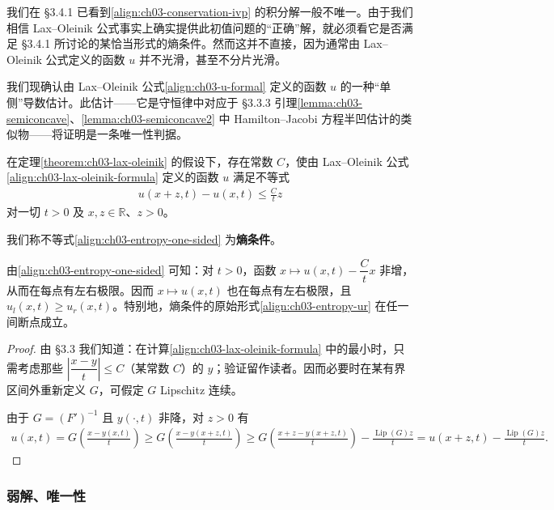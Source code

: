\documentclass[../../main.tex]{subfiles}
\begin{document}
我们在 \S3.4.1 已看到\eqref{align:ch03-conservation-ivp} 的积分解一般不唯一。由于我们相信 Lax--Oleinik 公式事实上确实提供此初值问题的``正确''解，就必须看它是否满足 \S3.4.1 所讨论的某恰当形式的熵条件。然而这并不直接，因为通常由 Lax--Oleinik 公式定义的函数 $u$ 并不光滑，甚至不分片光滑。

我们现确认由 Lax--Oleinik 公式\eqref{align:ch03-u-formal} 定义的函数 $u$ 的一种``单侧''导数估计。此估计——它是守恒律中对应于 \S3.3.3 引理\cref{lemma:ch03-semiconcave}、\cref{lemma:ch03-semiconcave2} 中 Hamilton--Jacobi 方程半凹估计的类似物——将证明是一条唯一性判据。

\begin{lemma}[单侧跃变估计]\label{lemma:ch03-one-sided-jump}在定理\cref{theorem:ch03-lax-oleinik} 的假设下，存在常数 $C$，使由 Lax--Oleinik 公式\eqref{align:ch03-lax-oleinik-formula} 定义的函数 $u$ 满足不等式
\begin{align}\label{align:ch03-entropy-one-sided}
u(x+z,t)-u(x,t)\leqslant\frac{C}{t}z
\end{align}
对一切 $t>0$ 及 $x,z\in\mathbb{R}$、$z>0$。
\end{lemma}

我们称不等式\eqref{align:ch03-entropy-one-sided} 为\textbf{熵条件}。

由\eqref{align:ch03-entropy-one-sided} 可知：对 $t>0$，函数 $x\mapsto u(x,t)-\dfrac{C}{t}x$ 非增，从而在每点有左右极限。因而 $x\mapsto u(x,t)$ 也在每点有左右极限，且 $u_l(x,t)\geqslant u_r(x,t)$。特别地，熵条件的原始形式\eqref{align:ch03-entropy-ur} 在任一间断点成立。

\begin{proof}
由 \S3.3 我们知道：在计算\eqref{align:ch03-lax-oleinik-formula} 中的最小时，只需考虑那些 $\left|\dfrac{x-y}{t}\right|\leqslant C$（某常数 $C$）的 $y$；验证留作读者。因而必要时在某有界区间外重新定义 $G$，可假定 $G$ Lipschitz 连续。

由于 $G=(F')^{-1}$ 且 $y(\cdot,t)$ 非降，对 $z>0$ 有
\begin{align*}
u(x,t)=G\!\left(\frac{x-y(x,t)}{t}\right)
\geqslant G\!\left(\frac{x-y(x+z,t)}{t}\right)
\geqslant G\!\left(\frac{x+z-y(x+z,t)}{t}\right)-\frac{\operatorname{Lip}(G)z}{t}
=u(x+z,t)-\frac{\operatorname{Lip}(G)z}{t}.
\end{align*}
\end{proof}

\subsubsection{弱解、唯一性}
\end{document}

